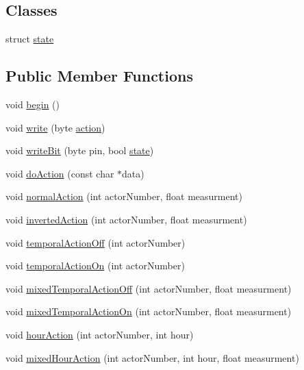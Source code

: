 \subsection*{Classes}
\begin{DoxyCompactItemize}
\item 
struct \hyperlink{struct_jetpack_1_1state}{state}
\end{DoxyCompactItemize}
\subsection*{Public Member Functions}
\begin{DoxyCompactItemize}
\item 
void \hyperlink{class_jetpack_a5a53e1ebf7aaf3bf3e0d37ea64ca09a7}{begin} ()
\item 
void \hyperlink{class_jetpack_a338f1af8cbc6504ac69b47c7328569b5}{write} (byte \hyperlink{class_jetpack_aca3142925a7b0834b34ae91d26af7765}{action})
\item 
void \hyperlink{class_jetpack_a79ae7bc3c1828a0551a7c005c4f8bd00}{write\+Bit} (byte pin, bool \hyperlink{struct_jetpack_1_1state}{state})
\item 
void \hyperlink{class_jetpack_a9e703197093094b963f9ad57817495b8}{do\+Action} (const char $\ast$data)
\item 
void \hyperlink{class_jetpack_a65ce9533c39fa71e4945b970bf14b980}{normal\+Action} (int actor\+Number, float measurment)
\item 
void \hyperlink{class_jetpack_adacfc35fab4a621357caf98ce1c9cb54}{inverted\+Action} (int actor\+Number, float measurment)
\item 
void \hyperlink{class_jetpack_a2991b302cd99bf89325f9b66b104d575}{temporal\+Action\+Off} (int actor\+Number)
\item 
void \hyperlink{class_jetpack_ad011d904f639accb5f94ef806846ef59}{temporal\+Action\+On} (int actor\+Number)
\item 
void \hyperlink{class_jetpack_af2f567ef6311a8fc2f7bb948837667b7}{mixed\+Temporal\+Action\+Off} (int actor\+Number, float measurment)
\item 
void \hyperlink{class_jetpack_af44bc8a08818e4433dfb1c7104601f12}{mixed\+Temporal\+Action\+On} (int actor\+Number, float measurment)
\item 
void \hyperlink{class_jetpack_acd6889af2fe5b057c6bd51b6dac827ef}{hour\+Action} (int actor\+Number, int hour)
\item 
void \hyperlink{class_jetpack_ac1a49ab4867718cdb415ad74c2066b9d}{mixed\+Hour\+Action} (int actor\+Number, int hour, float measurment)

\end{DoxyCompactItemize}
